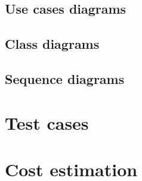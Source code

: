 \documentclass[a4paper]{scrreprt}
\begin{document}
\section{Use cases diagrams}

\section{Class diagrams}

\section{Sequence diagrams}


\chapter{Test cases}


\chapter{Cost estimation}



%
%
\end{document}
